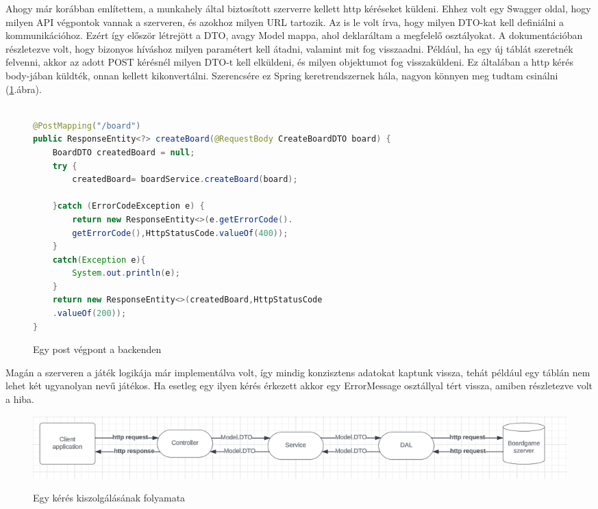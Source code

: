 \documentclass[a4paper,twoside]{article}
\begin{document}
Ahogy már korábban említettem, a munkahely által biztosított szerverre kellett http kéréseket
küldeni. Ehhez volt egy Swagger\cite{swagger} oldal, hogy milyen API végpontok vannak a szerveren, és
azokhoz milyen URL tartozik.  Az is le volt írva, hogy milyen DTO-kat kell definiálni a
kommunikációhoz. Ezért így először létrejött a DTO, avagy Model mappa, ahol deklaráltam a
megfelelő osztályokat. A dokumentációban részletezve volt, hogy bizonyos híváshoz milyen
paramétert kell átadni, valamint mit fog visszaadni. Például, ha egy új táblát szeretnék
felvenni, akkor az adott POST kérésnél milyen DTO-t kell elküldeni, és milyen objektumot
fog visszaküldeni. Ez általában a http kérés body-jában küldték, onnan kellett kikonvertálni. Szerencsére ez Spring keretrendszernek hála, nagyon könnyen meg tudtam csinálni (\ref{post-vegpont}.ábra).
\begin{figure}[h]
	\caption{Egy post végpont a backenden}
	\raggedleft
\begin{adjustwidth}{0cm}{10cm}
	\begin{minipage}{\textwidth}
	\begin{lstlisting}[language=java]
		
@PostMapping("/board")
public ResponseEntity<?> createBoard(@RequestBody CreateBoardDTO board) {
	BoardDTO createdBoard = null;
	try {
		createdBoard= boardService.createBoard(board);
		
	}catch (ErrorCodeException e) {
		return new ResponseEntity<>(e.getErrorCode().
		getErrorCode(),HttpStatusCode.valueOf(400));
	}
	catch(Exception e){
		System.out.println(e);
	}
	return new ResponseEntity<>(createdBoard,HttpStatusCode
	.valueOf(200));
}
	\end{lstlisting}
\end{minipage}
\end{adjustwidth}
	\label{post-vegpont}
\end{figure} 

Magán a szerveren a játék logikája már implementálva volt, így mindig
konzisztens adatokat kaptunk vissza, tehát például egy táblán nem lehet két ugyanolyan nevű
játékos. Ha esetleg egy ilyen kérés érkezett akkor egy ErrorMessage osztállyal tért vissza,
amiben részletezve volt a hiba.

\begin{figure}
	\caption{Egy kérés kiszolgálásának folyamata}
	\raggedleft 
	\includegraphics[scale=0.5]{backend-pipeline}
	\label{backend-pipeline}
\end{figure}
\end{document}
